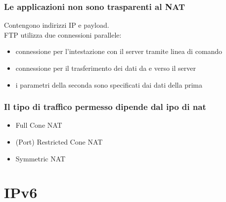 \documentclass{report}
\begin{document}
            \subsection{Le applicazioni non sono trasparenti al NAT}
                Contengono indirizzi IP e payload.
                \\
                FTP utilizza due connessioni parallele:
                \begin{itemize}
                    \item connessione per l'intestazione con il server tramite linea di comando 
                    \item connessione per il trasferimento dei dati da e verso il server
                    \item i parametri della seconda sono specificati dai dati della prima
                \end{itemize}
            \subsection{Il tipo di traffico permesso dipende dal ipo di nat}
                \begin{itemize}
                    \item Full Cone NAT
                    \item (Port) Restricted Cone NAT
                    \item Symmetric NAT
                \end{itemize}
    \chapter{IPv6}
\end{document}
